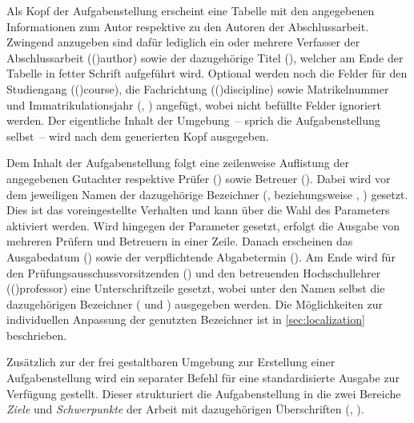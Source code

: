 \begin{DeclareEntity}{}
\begin{Declaration}
\begin{Declaration}
\begin{Declaration}
Als Kopf der Aufgabenstellung erscheint eine Tabelle mit den angegebenen 
Informationen zum Autor respektive zu den Autoren der Abschlussarbeit. Zwingend 
anzugeben sind dafür lediglich ein oder mehrere Verfasser der Abschlussarbeit 
(\Macro(){author}) sowie der dazugehörige Titel (), 
welcher am Ende der Tabelle in fetter Schrift aufgeführt wird. Optional werden 
noch die Felder für den Studiengang (\Macro(){course}), die 
Fachrichtung (\Macro(){discipline}) sowie Matrikelnummer und 
Immatrikulationsjahr (, ) 
angefügt, wobei nicht befüllte Felder ignoriert werden. Der eigentliche Inhalt 
der Umgebung~-- sprich die Aufgabenstellung selbst~-- wird nach dem generierten 
Kopf ausgegeben.

Dem Inhalt der Aufgabenstellung folgt eine zeilenweise Auflistung der 
angegebenen Gutachter respektive Prüfer () sowie Betreuer 
(). Dabei wird vor dem jeweiligen Namen der dazugehörige 
Bezeichner (,  beziehungsweise 
, ) gesetzt. 
Dies ist das voreingestellte Verhalten und kann über die Wahl des Parameters
%
 aktiviert werden. Wird hingegen der Parameter 
 gesetzt, erfolgt die Ausgabe von mehreren 
Prüfern und Betreuern in einer Zeile. Danach erscheinen das Ausgabedatum 
() sowie der verpflichtende Abgabetermin (). Am 
Ende wird für den Prüfungsausschussvorsitzenden () und den 
betreuenden Hochschullehrer (\Macro(){professor}) eine 
Unterschriftzeile gesetzt, wobei unter den Namen selbst die dazugehörigen 
Bezeichner ( und ) ausgegeben werden. 
Die Möglichkeiten zur individuellen Anpassung der genutzten Bezeichner ist in 
\autoref{sec:localization} beschrieben. 
\end{Declaration}
\end{Declaration}
\end{Declaration}

\begin{Declaration}
  {}
\printdeclarationlist
%
Zusätzlich zur der frei gestaltbaren Umgebung  zur Erstellung
einer Aufgabenstellung wird ein separater Befehl für eine standardisierte 
Ausgabe zur Verfügung gestellt. Dieser strukturiert die Aufgabenstellung in die 
zwei Bereiche \emph{Ziele} und \emph{Schwerpunkte} der Arbeit mit dazugehörigen 
Überschriften (, ).


\end{Declaration}
\end{DeclareEntity}
